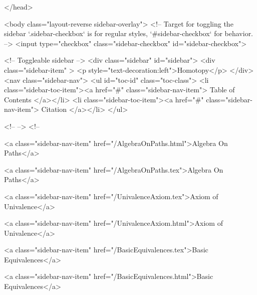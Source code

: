   
</head>




  <body class="layout-reverse sidebar-overlay">
    <!-- Target for toggling the sidebar `.sidebar-checkbox` is for regular
     styles, `#sidebar-checkbox` for behavior. -->
<input type="checkbox" class="sidebar-checkbox" id="sidebar-checkbox">

<!-- Toggleable sidebar -->
<div class="sidebar" id="sidebar">
  <div class="sidebar-item" >
    <p style="text-decoration:left">Homotopy</p>
  </div>
  <nav class="sidebar-nav">
    <ul id="toc-id" class="toc-class">
  <li class="sidebar-toc-item"><a href="#" class="sidebar-nav-item"> Table of Contents </a></li>
  <li class="sidebar-toc-item"><a href="#" class="sidebar-nav-item"> Citation </a></li>
</ul>


    <!--  -->
    <!-- 
      
    
      
    
      
    
      
    
      
        
      
    
      
        
          <a class="sidebar-nav-item" href="/AlgebraOnPaths.html">Algebra On Paths</a>
        
      
    
      
        
          <a class="sidebar-nav-item" href="/AlgebraOnPaths.tex">Algebra On Paths</a>
        
      
    
      
        
          <a class="sidebar-nav-item" href="/UnivalenceAxiom.tex">Axiom of Univalence</a>
        
      
    
      
        
          <a class="sidebar-nav-item" href="/UnivalenceAxiom.html">Axiom of Univalence</a>
        
      
    
      
        
          <a class="sidebar-nav-item" href="/BasicEquivalences.tex">Basic Equivalences</a>
        
      
    
      
        
          <a class="sidebar-nav-item" href="/BasicEquivalences.html">Basic Equivalences</a>
        
